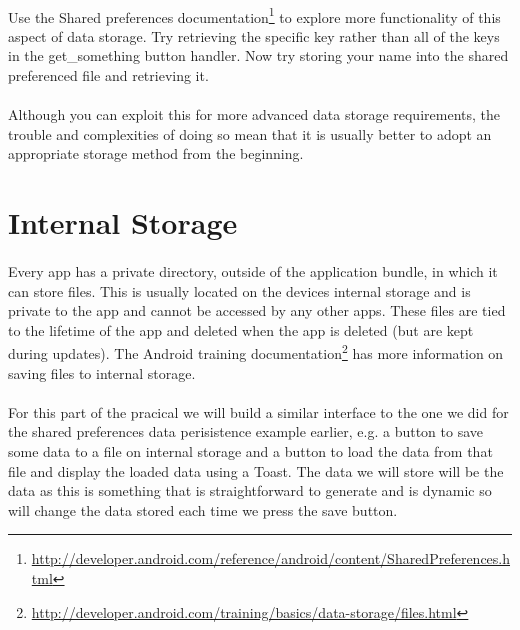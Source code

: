 \documentclass[12pt, a4paper, twoside]{book}
\begin{document}
\paragraph{} Use the Shared preferences documentation\footnote{\url{http://developer.android.com/reference/android/content/SharedPreferences.html}} to explore more functionality of this aspect of data storage. Try retrieving the specific key rather than all of the keys in the get\_something button handler. Now try storing your name into the shared preferenced file and retrieving it.

\paragraph{} Although you can exploit this for more advanced data storage requirements, the trouble and complexities of doing so mean that it is usually better to adopt an appropriate storage method from the beginning.

\section{Internal Storage}
\paragraph{} Every app has a private directory, outside of the application bundle, in which it can store files. This is usually located on the devices internal storage and is private to the app and cannot be accessed by any other apps. These files are tied to the lifetime of the app and deleted when the app is deleted (but are kept during updates). The Android training documentation\footnote{\url{http://developer.android.com/training/basics/data-storage/files.html}} has more information on saving files to internal storage.

\paragraph{} For this part of the pracical we will build a similar interface to the one we did for the shared preferences data perisistence example earlier, e.g. a button to save some data to a file on internal storage and a button to load the data from that file and display the loaded data using a Toast. The data we will store will be the data as this is something that is straightforward to generate and is dynamic so will change the data stored each time we press the save button.
\end{document}
